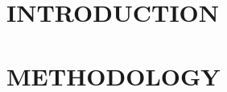 \documentclass[12pt]{article}
\begin{document}
\clearpage


\section*{\sffamily \Large INTRODUCTION} %








\section*{\sffamily \Large METHODOLOGY}

\end{document}
